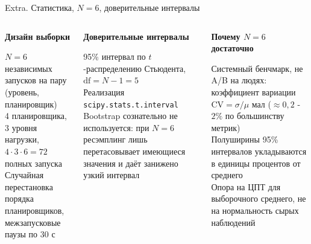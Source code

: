 \documentclass[aspectratio=169,11pt]{beamer}
\begin{document}
\begin{frame}{Extra. Статистика, $N=6$, доверительные интервалы}
        \footnotesize
        \begin{columns}[T]
                \begin{shadowbox}
                        \textbf{Дизайн выборки}

                        \scriptsize
                        $N = 6$ независимых запусков на пару
                        (уровень, планировщик)\\[0.15em]
                        4 планировщика, 3 уровня нагрузки, $4 \cdot
                        3 \cdot 6 = 72$ полных запуска\\[0.15em]
                        Случайная перестановка порядка планировщиков,
                        межзапусковые паузы по 30 с
                \end{shadowbox}

                \begin{shadowbox}
                        \textbf{Доверительные интервалы}

                        \scriptsize
                        95\% интервал по $t$-распределению Стьюдента,
                        $\mathrm{df} = N - 1 = 5$\\[0.15em]
                        Реализация
                        \texttt{scipy.stats.t.interval}\\[0.15em]
                        Bootstrap сознательно не используется: при
                        $N = 6$ ресэмплинг лишь перетасовывает
                        имеющиеся значения и даёт занижено узкий
                        интервал
                \end{shadowbox}

                \begin{shadowbox2}
                        \textbf{Почему $N=6$ достаточно}

                        \scriptsize
                        Системный бенчмарк, не A/B на людях:
                        коэффициент вариации $\mathrm{CV} = \sigma /
                        \mu$ мал ($\approx 0{,}2$ - $2\%$ по
                        большинству метрик)\\[0.15em]
                        Полуширины 95\% интервалов укладываются в
                        единицы процентов от среднего\\[0.15em]
                        Опора на ЦПТ для выборочного среднего, не
                        на нормальность сырых наблюдений
                \end{shadowbox2}


\end{columns}
\end{frame}
\end{document}
